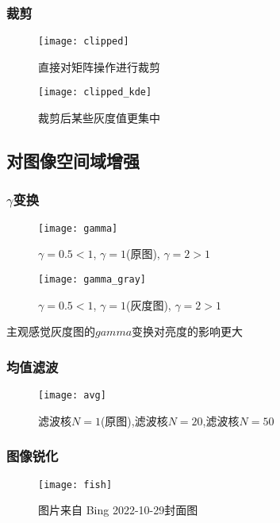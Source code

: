 \documentclass{myreport}
\begin{document}
    \subsubsection{裁剪}
      \begin{figure}[H]
        \centering
        \texttt{[image: clipped]}
        \caption{直接对矩阵操作进行裁剪}
        \label{fig:clipped}
      \end{figure}

      \begin{figure}[H]
        \centering
        \texttt{[image: clipped\_kde]}
        \caption{裁剪后某些灰度值更集中}
        \label{fig:clipped_kde}
      \end{figure}
  \subsection{对图像空间域增强}
    \subsubsection{$\gamma$变换}
      \begin{figure}[H]
        \centering
        \texttt{[image: gamma]}
        \caption{$\gamma = 0.5 <1$, $\gamma = 1$(原图), $\gamma = 2 > 1$}
        \label{fig:gamma}
      \end{figure}

      \begin{figure}[H]
        \centering
        \texttt{[image: gamma\_gray]}
        \caption{$\gamma = 0.5 <1$, $\gamma = 1$(灰度图), $\gamma = 2 > 1$}
        \label{fig:gamma}
      \end{figure}
      主观感觉灰度图的$gamma$变换对亮度的影响更大
    \subsubsection{均值滤波}
      \begin{figure}[H]
        \centering
        \texttt{[image: avg]}
        \caption{滤波核$N=1$(原图),滤波核$N=20$,滤波核$N=50$}
        \label{fig:avg}
      \end{figure}
    \subsubsection{图像锐化}
      \begin{figure}[H]
        \centering
        \texttt{[image: fish]}
        \caption{图片来自 Bing 2022-10-29封面图}
        \label{fig:fish}
      \end{figure}
\end{document}
